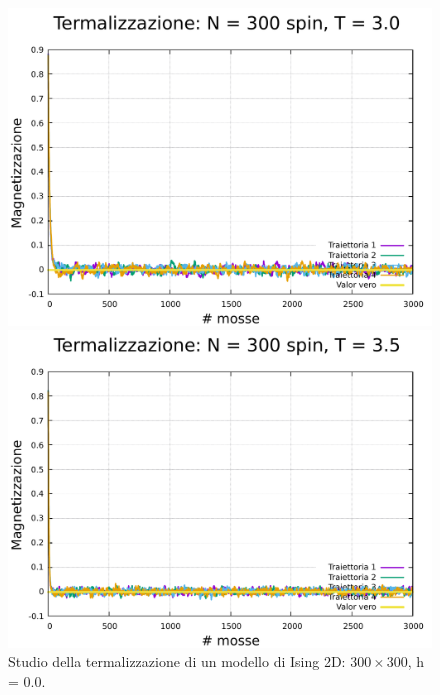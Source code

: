 \begin{figure}[H]
    \begin{minipage}{0.45\textwidth}  
      \centering
      \includegraphics[page=1, width=\textwidth]{Immagini/simIsing2D/metro/term/term_300_3.0.pdf}
      \caption{$T\,=\,3.0$}
    \end{minipage}\hfill
    \begin{minipage}{0.45\textwidth}  
      \centering
      \includegraphics[page=1, width=\textwidth]{Immagini/simIsing2D/metro/term/term_300_3.5.pdf}
      \caption{$T\,=\,3.5$}
    \end{minipage}
    \caption{Studio della termalizzazione di un modello di Ising 2D: $300 \times 300$, h = 0.0.}
\end{figure}

